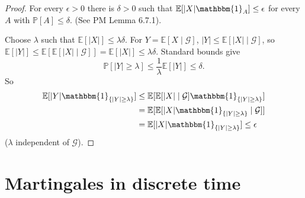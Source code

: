 \documentclass{article}
\newcommand{\G}{\mathcal{G}}
\newcommand{\1}[1]{\mathbbm{1}_{#1}}
\newcommand{\Prob}{\mathbb{P}}
\newcommand{\E}{\mathbb{E}}
\begin{document}
\begin{proof}
  For every $\epsilon> 0$ there is $\delta > 0$ such that $\E[|X| \1A] \leq \epsilon$ for every $A$ with $\Prob[A] \leq \delta$. (See PM Lemma 6.7.1).

  Choose $\lambda$ such that $\E[|X|] \leq \lambda \delta$.
  For $Y = \E[X \mid \G]$,
  $|Y| \leq \E[|X| \mid \G]$, so $\E[|Y|] \leq \E[\E[|X| \mid \G] ] = \E[|X|] \leq \lambda \delta$.
  Standard bounds give
  \begin{equation*}
    \Prob[|Y| \geq \lambda] \leq \frac{1}{\lambda} \E[|Y|] \leq \delta
  .\end{equation*}
  So
  \begin{align*}
    \E[|Y| \1{\{|Y| \geq \lambda\}}] & \leq \E[\E[|X| \mid \G] \1{\{|Y| \geq \lambda\}}] \\ %
                                     &= \E[\E[|X| \1{\{|Y| \geq \lambda\}} \mid \G]] \\
                                     &= \E[|X| \1{\{|Y| \geq \lambda\}}] \leq \epsilon
  \end{align*}
  ($\lambda$ independent of $\G$).
\end{proof}

\section{Martingales in discrete time}
\end{document}
